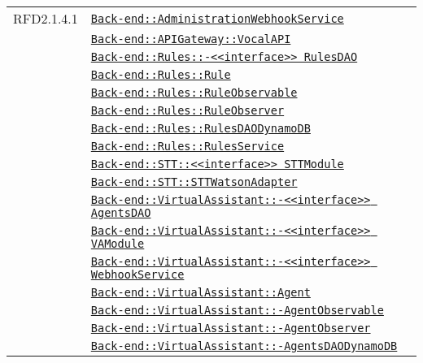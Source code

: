 \begin{longtable}{|>{\centering}m{3cm}|m{10cm}<{\centering}|}
RFD2.1.4.1 & \hyperref[Back-end::AdministrationWebhookService]{\texttt{Back-end::AdministrationWebhookService}}\\
& \hyperref[Back-end::APIGateway::VocalAPI]{\texttt{Back-end::APIGateway::VocalAPI}}\\
& \hyperref[Back-end::Rules::<<interface>> RulesDAO]{\texttt{Back-end::Rules::-\linebreak <<interface>> RulesDAO}}\\
& \hyperref[Back-end::Rules::Rule]{\texttt{Back-end::Rules::Rule}}\\
& \hyperref[Back-end::Rules::RuleObservable]{\texttt{Back-end::Rules::RuleObservable}}\\
& \hyperref[Back-end::Rules::RuleObserver]{\texttt{Back-end::Rules::RuleObserver}}\\
& \hyperref[Back-end::Rules::RulesDAODynamoDB]{\texttt{Back-end::Rules::RulesDAODynamoDB}}\\
& \hyperref[Back-end::Rules::RulesService]{\texttt{Back-end::Rules::RulesService}}\\
& \hyperref[Back-end::STT::<<interface>> STTModule]{\texttt{Back-end::STT::<<interface>> STTModule}}\\
& \hyperref[Back-end::STT::STTWatsonAdapter]{\texttt{Back-end::STT::STTWatsonAdapter}}\\
& \hyperref[Back-end::VirtualAssistant::<<interface>> AgentsDAO]{\texttt{Back-end::VirtualAssistant::-\linebreak <<interface>> AgentsDAO}}\\
& \hyperref[Back-end::VirtualAssistant::<<interface>> VAModule]{\texttt{Back-end::VirtualAssistant::-\linebreak <<interface>> VAModule}}\\
& \hyperref[Back-end::VirtualAssistant::<<interface>> WebhookService]{\texttt{Back-end::VirtualAssistant::-\linebreak <<interface>> WebhookService}}\\
& \hyperref[Back-end::VirtualAssistant::Agent]{\texttt{Back-end::VirtualAssistant::Agent}}\\
& \hyperref[Back-end::VirtualAssistant::AgentObservable]{\texttt{Back-end::VirtualAssistant::-\linebreak AgentObservable}}\\
& \hyperref[Back-end::VirtualAssistant::AgentObserver]{\texttt{Back-end::VirtualAssistant::-\linebreak AgentObserver}}\\
& \hyperref[Back-end::VirtualAssistant::AgentsDAODynamoDB]{\texttt{Back-end::VirtualAssistant::-\linebreak AgentsDAODynamoDB}}\\

\end{longtable}
